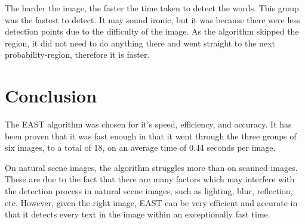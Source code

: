 \documentclass[10pt, a4paper]{article}
\begin{document}
The harder the image, the faster the time taken to detect the words. This group was the fastest to detect. It may sound ironic, but it was because there were less detection points due to the difficulty of the image. As the algorithm skipped the region, it did not need to do anything there and went straight to the next probability-region, therefore it is faster.
\clearpage
\section{Conclusion} %
\label{sec:conclusion}
The EAST algorithm was chosen for it's speed, efficiency, and accuracy. It has been proven that it was fast enough in that it went through the three groups of six images, to a total of 18, on an average time of 0.44 seconds per image. 

On natural scene images, the algorithm struggles more than on scanned images. These are due to the fact that there are many factors which may interfere with the detection process in natural scene images, such as lighting, blur, reflection, etc. However, given the right image, EAST can be very efficient and accurate in that it detects every text in the image within an exceptionally fast time.
\clearpage
\newpage 


\end{document}
